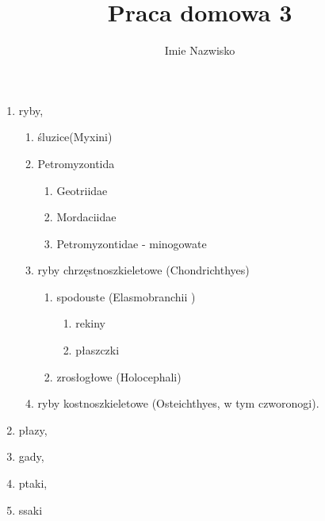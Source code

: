 \documentclass[a4paper, 12pt]{amsart}
\author{Imie Nazwisko}
\title{Praca domowa 3}
\begin{document}
\maketitle


\begin{enumerate}
\item ryby,
\begin{enumerate}
    \item śluzice(Myxini)
    \item Petromyzontida
    	\begin{enumerate}
    	\item Geotriidae
    	\item Mordaciidae
    	\item Petromyzontidae - minogowate
    	\end{enumerate}
    \item ryby chrzęstnoszkieletowe (Chondrichthyes)
   		 \begin{enumerate}
    	 \item spodouste (Elasmobranchii )
   			\begin{enumerate}
    		\item rekiny
    		\item płaszczki
    		\end{enumerate}
   		 \item zrosłogłowe (Holocephali)
    	 \end{enumerate}
    \item ryby kostnoszkieletowe (Osteichthyes, w tym czworonogi).
  \end{enumerate}
\item płazy,
\item gady,
\item ptaki,
\item ssaki

\end{enumerate}
\end{document}
